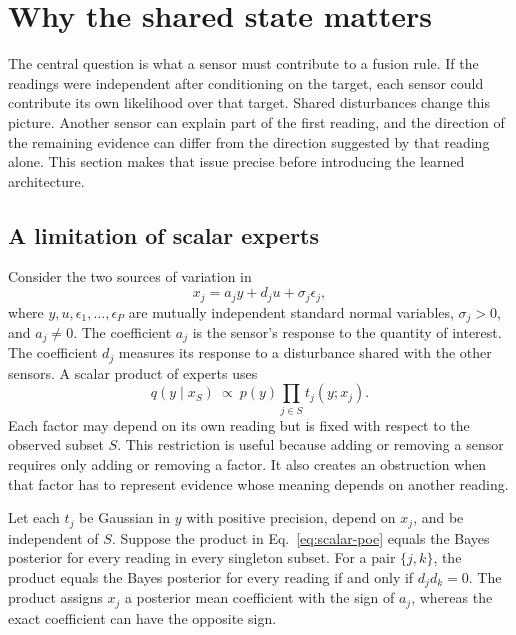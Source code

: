 \section{Why the shared state matters}
\label{sec:theory}

The central question is what a sensor must contribute to a fusion rule. If the readings were independent after conditioning on the target, each sensor could contribute its own likelihood over that target. Shared disturbances change this picture. Another sensor can explain part of the first reading, and the direction of the remaining evidence can differ from the direction suggested by that reading alone. This section makes that issue precise before introducing the learned architecture.

\subsection{A limitation of scalar experts}
\label{sec:scalar}

Consider the two sources of variation in
\begin{equation}
 x_j=a_jy+d_ju+\sigma_j\epsilon_j ,
 \label{eq:scalar-model}
\end{equation}
where \(y,u,\epsilon_1,\ldots,\epsilon_P\) are mutually independent standard normal variables, \(\sigma_j>0\), and \(a_j\ne0\). The coefficient \(a_j\) is the sensor's response to the quantity of interest. The coefficient \(d_j\) measures its response to a disturbance shared with the other sensors. A scalar product of experts uses
\begin{equation}
 q(y\mid x_S)\ \propto\ p(y)\prod_{j\in S}t_j(y;x_j).
 \label{eq:scalar-poe}
\end{equation}
Each factor may depend on its own reading but is fixed with respect to the observed subset \(S\). This restriction is useful because adding or removing a sensor requires only adding or removing a factor. It also creates an obstruction when that factor has to represent evidence whose meaning depends on another reading.

\begin{proposition}
\label{prop:scalar}
Let each \(t_j\) be Gaussian in \(y\) with positive precision, depend on \(x_j\), and be independent of \(S\). Suppose the product in Eq.~\eqref{eq:scalar-poe} equals the Bayes posterior for every reading in every singleton subset. For a pair \(\{j,k\}\), the product equals the Bayes posterior for every reading if and only if \(d_jd_k=0\). The product assigns \(x_j\) a posterior mean coefficient with the sign of \(a_j\), whereas the exact coefficient can have the opposite sign.
\end{proposition}

